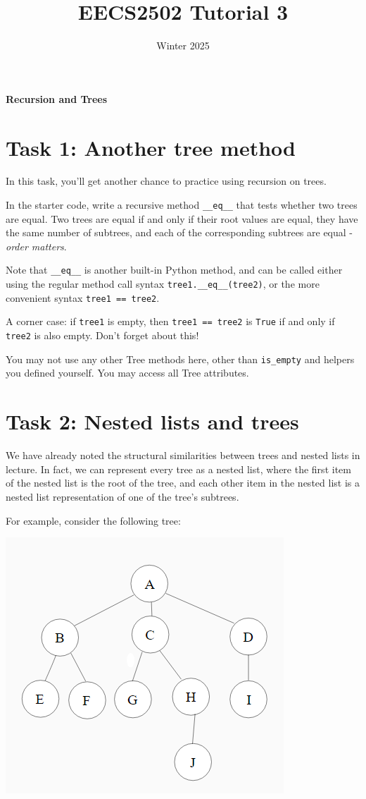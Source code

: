 \documentclass{article}
\title{EECS2502 Tutorial 3}
\date{Winter 2025}
\begin{document}
\begin{center}
\begin{Large}
  \textbf{Recursion and Trees}
\end{Large}

\end{center}



\section*{Task 1: Another tree method}
In this task, you'll get another chance to practice using recursion on trees.

In the starter code, write a recursive method \verb|__eq__| that tests whether two trees are equal. Two trees are equal if and only if their root values are equal, they have the same number of subtrees, and each of the corresponding subtrees are equal - \emph{order matters}.

Note that \verb|__eq__| is another built-in Python method, and can be called either using the regular method call syntax  \verb|tree1.__eq__(tree2)|, or the more convenient syntax \verb|tree1 == tree2|.

A corner case: if \verb|tree1| is empty, then \verb|tree1 == tree2| is \verb|True| if and only if \verb|tree2| is also empty. Don't forget about this!

You may not use any other Tree methods here, other than \verb|is_empty| and helpers you defined yourself. You may access all Tree attributes.

\section*{Task 2: Nested lists and trees}
We have already noted the structural similarities between trees and nested lists in lecture. In fact, we can represent every tree as a nested list, where the first item of the nested list is the root of the tree, and each other item in the nested list is a nested list representation of one of the tree's subtrees.

For example, consider the following tree:

\includegraphics{tree}
\end{document}

